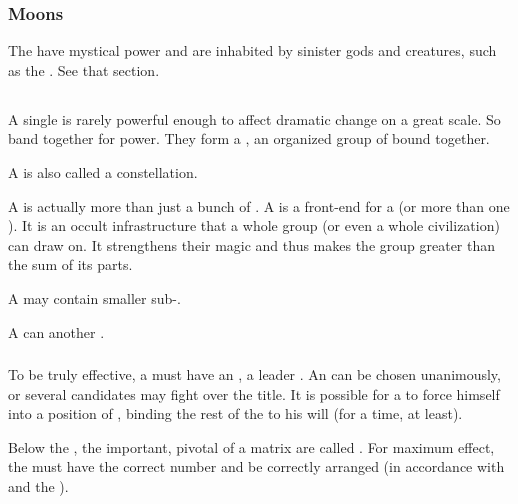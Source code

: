 \subsubsection{Moons}
The  have mystical power and are inhabited by sinister gods and creatures, such as the .
See that section.









\subsection{\Matrix}
A single \vertex is rarely powerful enough to affect dramatic change on a great scale. 
So \vertices{} band together for power. 
They form a \nexus, an organized group of \vertices{} bound together. 

A \nexus{} is also called a constellation. 

A \nexus{} is actually more than just a bunch of \vertices. 
A \nexus{} is a front-end for a \dweomer{} (or more than one \dweomer). 
It is an occult infrastructure that a whole group (or even a whole civilization) can draw on. 
It strengthens their magic and thus makes the group greater than the sum of its parts. 

A \nexus{} may contain smaller sub-\nexuses. 

A \nexus{} can  another \nexus. 





\subsubsection{\Apex}
\index{\apex}
To be truly effective, a \nexus{} must have an \apex, a leader \vertex. An \apex{} can be chosen unanimously, or several candidates may fight over the title. It is possible for a \vertex{} to force himself into a position of \apex, binding the rest of the \nexus{} to his will (for a time, at least). 

\index{\cardinalpoint}
Below the \apex, the important, pivotal \vertices{} of a matrix are called \cardinalpoints. 
For maximum effect, the \cardinalpoints must have the correct number and be correctly arranged (in accordance with  and the ). 





